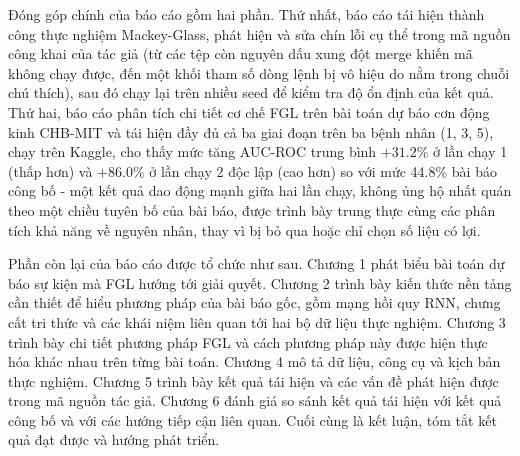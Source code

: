 Đóng góp chính của báo cáo gồm hai phần. Thứ nhất, báo cáo tái hiện thành công thực nghiệm
Mackey-Glass, phát hiện và sửa chín lỗi cụ thể trong mã nguồn công khai của tác giả (từ các
tệp còn nguyên dấu xung đột merge khiến mã không chạy được, đến một khối tham số dòng lệnh bị
vô hiệu do nằm trong chuỗi chú thích), sau đó chạy lại trên nhiều seed để kiểm tra độ ổn định
của kết quả. Thứ hai, báo cáo phân tích chi tiết cơ chế FGL trên bài toán dự báo cơn động kinh
CHB-MIT và tái hiện đầy đủ cả ba giai đoạn trên ba bệnh nhân (1, 3, 5), chạy trên Kaggle,
cho thấy mức tăng AUC-ROC trung bình $+31.2\%$ ở lần chạy 1 (thấp hơn) và $+86.0\%$ ở lần
chạy 2 độc lập (cao hơn) so với mức 44.8\% bài báo công bố - một kết quả dao động mạnh giữa
hai lần chạy, không ủng hộ nhất quán theo một chiều tuyên bố của bài báo, được trình bày
trung thực cùng các phân tích khả năng về nguyên nhân, thay vì bị bỏ qua hoặc chỉ chọn số
liệu có lợi.

Phần còn lại của báo cáo được tổ chức như sau. Chương 1 phát biểu bài toán dự báo sự kiện mà
FGL hướng tới giải quyết. Chương 2 trình bày kiến thức nền tảng cần thiết để hiểu phương pháp
của bài báo gốc, gồm mạng hồi quy RNN, chưng cất tri thức và các khái niệm liên quan tới hai bộ
dữ liệu thực nghiệm. Chương 3 trình bày chi tiết phương pháp FGL và cách phương pháp này được
hiện thực hóa khác nhau trên từng bài toán. Chương 4 mô tả dữ liệu, công cụ và kịch bản thực
nghiệm. Chương 5 trình bày kết quả tái hiện và các vấn đề phát hiện được trong mã nguồn tác
giả. Chương 6 đánh giá so sánh kết quả tái hiện với kết quả công bố và với các hướng tiếp cận
liên quan. Cuối cùng là kết luận, tóm tắt kết quả đạt được và hướng phát triển.
